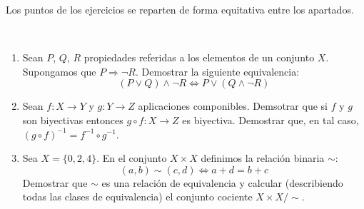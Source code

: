 \documentclass[12pt]{article}
\begin{document}
    Los puntos de los ejercicios se reparten de forma equitativa entre los apartados.
    \begin{ejercicio}[3 puntos]
        \
        \begin{enumerate}[label=(\alph*)]
            \item Sean $P$, $Q$, $R$ propiedades referidas a los elementos de un conjunto $X$. Supongamos que $P\Longrightarrow \lnot R$. Demostrar la siguiente equivalencia:
                \begin{equation*}
                    (P\lor Q) \land \lnot R \Longleftrightarrow P\lor (Q \land \lnot R)
                \end{equation*}
            \item Sean $f:X\rightarrow Y$ y $g:Y\rightarrow Z$ aplicaciones componibles. Demsotrar que si $f$ y $g$ son biyectivas entonces $g\circ f:X\rightarrow Z$ es biyectiva. Demostrar que, en tal caso, ${(g\circ f)}^{-1} = f^{-1}\circ g^{-1}$.
            \item Sea $X=\{0,2,4\}$. En el conjunto $X\times X$ definimos la relación binaria $\sim$:
                \begin{equation*}
                    (a,b)\sim (c,d) \Longleftrightarrow a+d = b+c
                \end{equation*}
                Demostrar que $\sim$ es una relación de equivalencia y calcular (describiendo todas las clases de equivalencia) el conjunto cociente $X\times X/\sim$.
        \end{enumerate}~\\


\end{ejercicio}
\end{document}
